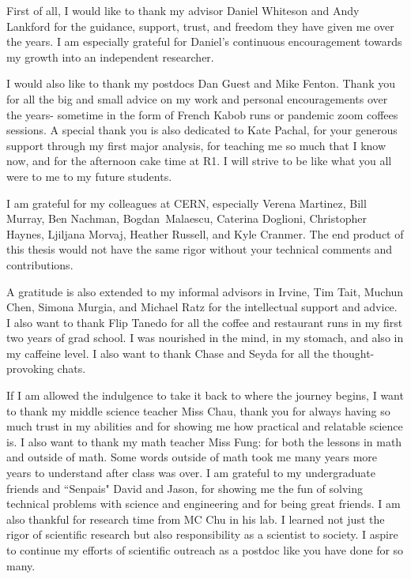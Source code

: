  First of all, I would like to thank my advisor Daniel Whiteson and Andy Lankford for the guidance, support, trust, and freedom they have given me over the years. I am especially grateful for Daniel's continuous encouragement towards my growth into an independent researcher. 

I would also like to thank my postdocs Dan Guest and Mike Fenton. Thank you for all the big and small advice on my work and personal encouragements over the years- sometime in the form of French Kabob runs or pandemic zoom coffees sessions. A special thank you is also dedicated to Kate Pachal, for your generous support through my first major analysis, for teaching me so much that I know now, and for the afternoon cake time at R1. I will strive to be like what you all were to me to my future students.

I am grateful for my colleagues at CERN, especially Verena Martinez, Bill Murray, Ben Nachman, Bogdan Malaescu, Caterina Doglioni, Christopher Haynes, Ljiljana Morvaj, Heather Russell, and Kyle Cranmer. The end product of this thesis would not have the same rigor without your technical comments and contributions.

A gratitude is also extended to my informal advisors in Irvine, Tim Tait, Muchun Chen, Simona Murgia, and Michael Ratz for the intellectual support and advice. I also want to thank Flip Tanedo for all the coffee and restaurant runs in my first two years of grad school. I was nourished in the mind, in my stomach, and also in my caffeine level. I also want to thank Chase and Seyda for all the thought-provoking chats.

If I am allowed the indulgence to take it back to where the journey begins, I want to thank my middle science teacher Miss Chau, thank you for always having so much trust in my abilities and for showing me how practical and relatable science is. I also want to thank my math teacher Miss Fung: for both the lessons in math and outside of math. Some words outside of math took me many years more years to understand after class was over. I am grateful to my undergraduate friends and
``Senpais" David and Jason, for showing me the fun of solving technical problems with science and engineering and for being great friends. I am also thankful for research time from MC Chu in his lab. I learned not just the rigor of scientific research but also responsibility as a scientist to society. I aspire to continue my efforts of scientific outreach as a postdoc like you have done for so many. 

